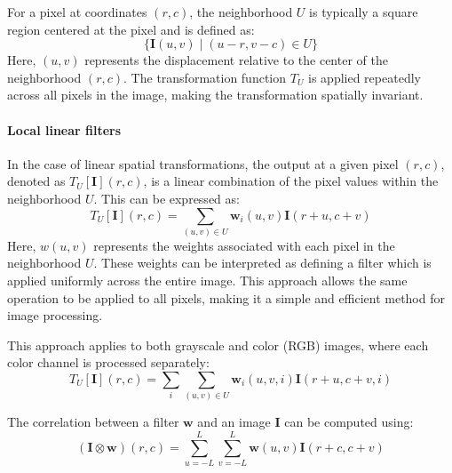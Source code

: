 For a pixel at coordinates $(r, c)$, the neighborhood $U$  is typically a square region centered at the pixel and is defined as:
\[\{\mathbf{I}(u,v)\mid(u-r,v-c)\in U\}\]
Here, $(u, v)$ represents the displacement relative to the center of the neighborhood $(r, c)$.
The transformation function $T_U$ is applied repeatedly across all pixels in the image, making the transformation spatially invariant.

\paragraph*{Local linear filters}
In the case of linear spatial transformations, the output at a given pixel $(r,c)$, denoted as $T_U[\mathbf{I}](r,c)$, is a linear combination of the pixel values within the neighborhood $U$. 
This can be expressed as:
\[T_U[\mathbf{I}](r,c)=\sum_{(u,v)\in U}\mathbf{w}_i(u,v)\mathbf{I}(r+u,c+v)\]
Here, $w(u, v)$ represents the weights associated with each pixel in the neighborhood $U$.
These weights can be interpreted as defining a filter which is applied uniformly across the entire image. 
This approach allows the same operation to be applied to all pixels, making it a simple and efficient method for image processing.

This approach applies to both grayscale and color (RGB) images, where each color channel is processed separately:
\[T_U[\mathbf{I}](r,c)=\sum_i\sum_{(u,v)\in U}\mathbf{w}_i(u,v,i)\mathbf{I}(r+u,c+v,i)\]

The correlation between a filter $\mathbf{w}$ and an image $\mathbf{I}$ can be computed using:
\[(\mathbf{I}\otimes \mathbf{w})(r,c)=\sum_{u=-L}^L\sum_{v=-L}^L\mathbf{w}(u,v)\mathbf{I}(r+c,c+v)\]